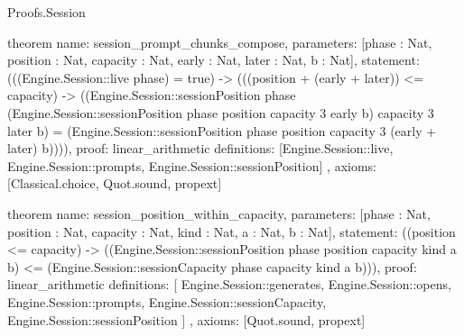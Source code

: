 \begin{lexlean}{Proofs.Session}
\begin{semanticmodule}
theorem{
  name: session_prompt_chunks_compose,
  parameters: [phase : Nat, position : Nat, capacity : Nat, early : Nat, later : Nat, b : Nat],
  statement: (((Engine.Session::live phase) = true) -> (((position + (early + later)) <= capacity) -> ((Engine.Session::sessionPosition phase (Engine.Session::sessionPosition phase position capacity 3 early b) capacity 3 later b) = (Engine.Session::sessionPosition phase position capacity 3 (early + later) b)))),
  proof: linear_arithmetic{
    definitions: [Engine.Session::live, Engine.Session::prompts, Engine.Session::sessionPosition]
  },
  axioms: [Classical.choice, Quot.sound, propext]
}

theorem{
  name: session_position_within_capacity,
  parameters: [phase : Nat, position : Nat, capacity : Nat, kind : Nat, a : Nat, b : Nat],
  statement: ((position <= capacity) -> ((Engine.Session::sessionPosition phase position capacity kind a b) <= (Engine.Session::sessionCapacity phase capacity kind a b))),
  proof: linear_arithmetic{
    definitions: [
      Engine.Session::generates,
      Engine.Session::opens,
      Engine.Session::prompts,
      Engine.Session::sessionCapacity,
      Engine.Session::sessionPosition
    ]
  },
  axioms: [Quot.sound, propext]
}
\end{semanticmodule}
\end{lexlean}
